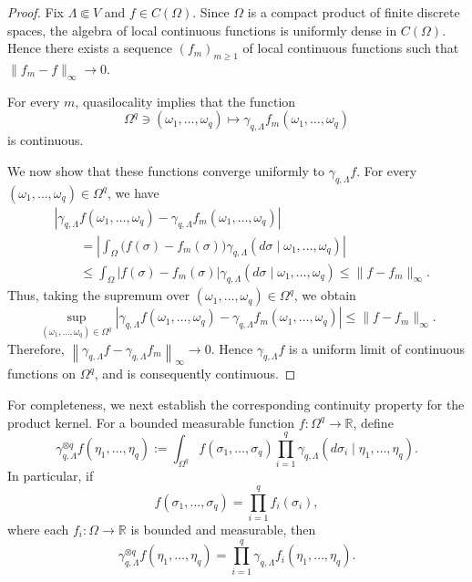 \documentclass[11pt,reqno]{amsart}
\numberwithin{equation}{section} \setcounter{tocdepth}{1}
\begin{document}
\begin{proof}
	Fix $\Lambda\Subset V$ and $f\in C(\Omega)$. Since $\Omega$ is a
	compact product of finite discrete spaces, the algebra of local
	continuous functions is uniformly dense in $C(\Omega)$. Hence there
	exists a sequence $(f_m)_{m\ge1}$ of local continuous functions such
	that
	$
	\|f_m-f\|_\infty\longrightarrow0.
	$
	
	For every $m$, quasilocality implies that the function
	\[
	\Omega^q\ni(\omega_1,\ldots,\omega_q)
	\longmapsto
	\gamma_{q,\Lambda}f_m(\omega_1,\ldots,\omega_q)
	\]
	is continuous.
	
	We now show that these functions converge uniformly to
	$\gamma_{q,\Lambda}f$. For every
	$(\omega_1,\ldots,\omega_q)\in\Omega^q$, we have
	\begin{align*}
		&\left|
		\gamma_{q,\Lambda}f(\omega_1,\ldots,\omega_q)
		-
		\gamma_{q,\Lambda}f_m(\omega_1,\ldots,\omega_q)
		\right|
		\\
		&\qquad=
		\left|
		\int_\Omega
		\bigl(f(\sigma)-f_m(\sigma)\bigr)
		\gamma_{q,\Lambda}
		(d\sigma\mid\omega_1,\ldots,\omega_q)
		\right|
		\\
		&\qquad\leq
		\int_\Omega
		|f(\sigma)-f_m(\sigma)|
		\gamma_{q,\Lambda}
		(d\sigma\mid\omega_1,\ldots,\omega_q)
		\leq
		\|f-f_m\|_\infty.
	\end{align*}
	Thus, taking the supremum over
	$(\omega_1,\ldots,\omega_q)\in\Omega^q$, we obtain
	\[
	\sup_{(\omega_1,\ldots,\omega_q)\in\Omega^q}
	\left|
	\gamma_{q,\Lambda}f(\omega_1,\ldots,\omega_q)
	-
	\gamma_{q,\Lambda}f_m(\omega_1,\ldots,\omega_q)
	\right|
	\leq
	\|f-f_m\|_\infty.
	\]
	Therefore, $
	\left\|
	\gamma_{q,\Lambda}f-\gamma_{q,\Lambda}f_m
	\right\|_\infty
	\longrightarrow0.$ 
	Hence $\gamma_{q,\Lambda}f$ is a uniform limit of continuous
	functions on $\Omega^q$, and is consequently continuous.
\end{proof}


For completeness, we next establish the corresponding continuity
property for the product kernel. For a bounded measurable function
$f:\Omega^q\to\mathbb R$, define
\[
\gamma_{q,\Lambda}^{\otimes q}f
(\eta_1,\ldots,\eta_q)
:=
\int_{\Omega^q}
f(\sigma_1,\ldots,\sigma_q)
\prod_{i=1}^q
\gamma_{q,\Lambda}
(d\sigma_i\mid\eta_1,\ldots,\eta_q).
\]
In particular, if
\[
f(\sigma_1,\ldots,\sigma_q)
=
\prod_{i=1}^q f_i(\sigma_i),
\]
where each $f_i:\Omega\to\mathbb R$ is bounded and measurable, then
\[
\gamma_{q,\Lambda}^{\otimes q}f
(\eta_1,\ldots,\eta_q)
=
\prod_{i=1}^q
\gamma_{q,\Lambda}f_i
(\eta_1,\ldots,\eta_q).
\]
\end{document}

